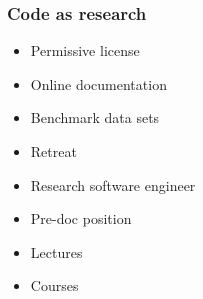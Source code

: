 \begin{frame}\frametitle{Code as research}


  \begin{multicols}{2}
    \vspace{0.3cm}
    \begin{itemize}\setlength\itemsep{1em}
      \item Permissive license
      \item Online documentation
      \item Benchmark data sets
      \item Retreat
    \end{itemize}

    \pause

    \vspace{0.3cm}
    \begin{itemize}\setlength\itemsep{1em}
      \item Research software engineer
      \item Pre-doc position
      \item Lectures
      \item Courses
  \end{itemize}
  \end{multicols}

\end{frame}
